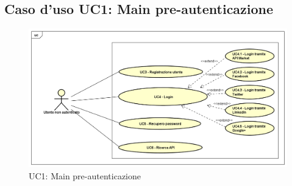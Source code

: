 \newpage
\subsection{Caso d'uso UC1: Main pre-autenticazione}
\label{UC1}
\begin{figure}[ht]
	\centering
	\includegraphics[scale=0.45]{UML/UC1.png}
	\caption{UC1: Main pre-autenticazione}
\end{figure}

